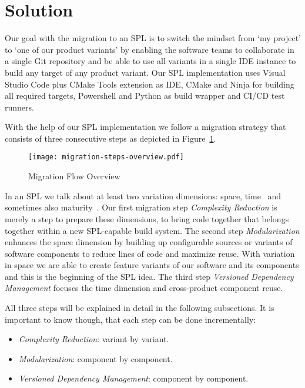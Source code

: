 \section{Solution}\label{solution}

Our goal with the migration to an SPL is to switch the mindset from `my project'
to `one of our product variants' by enabling the software teams to collaborate
in a single Git repository and be able to use all variants in a single IDE
instance to build any target of any product variant. Our SPL implementation uses
Visual Studio Code plus CMake Tools extension as IDE, CMake and Ninja for
building all required targets, Powershell and Python as build wrapper and CI/CD
test runners.

With the help of our SPL implementation we follow a migration strategy that
consists of three consecutive steps as depicted in Figure~\ref{fig:migrationFlow}.

\begin{figure}[htb]
  \centering
  \texttt{[image: migration-steps-overview.pdf]}
  \caption{Migration Flow Overview}
  \label{fig:migrationFlow}
\end{figure}

In an SPL we talk about at least two variation dimensions: space,
time~\cite{appliedSPLE} and sometimes also maturity~\cite{bigleverwhitepaper}.
Our first migration step \textit{Complexity Reduction} is merely a step to
prepare these dimensions, to bring code together that belongs together within a
new SPL-capable build system. The second step \textit{Modularization} enhances
the space dimension by building up configurable sources or variants of software
components to reduce lines of code and maximize reuse. With variation in space
we are able to create feature variants of our software and its components and
this is the beginning of the SPL idea. The third step \textit{Versioned
Dependency Management} focuses the time dimension and cross-product component
reuse.

All three steps will be explained in detail in the following subsections.
It is important to know though, that each step can be done incrementally:
\begin{itemize}
  \item \textit{Complexity Reduction}: variant by variant.
  \item \textit{Modularization}: component by component.
  \item \textit{Versioned Dependency Management}: component by component.
\end{itemize}

